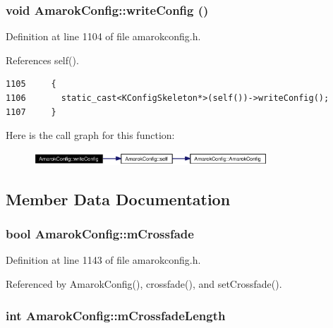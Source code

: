 \subsubsection{\setlength{\rightskip}{0pt plus 5cm}void Amarok\-Config::write\-Config ()\hspace{0.3cm}{\tt  [inline, static]}}\label{classAmarokConfig_AmarokConfige115}




Definition at line 1104 of file amarokconfig.h.

References self().



\footnotesize\begin{verbatim}1105     {
1106       static_cast<KConfigSkeleton*>(self())->writeConfig();
1107     }
\end{verbatim}\normalsize 


Here is the call graph for this function:\begin{figure}[H]
\begin{center}
\leavevmode
\includegraphics[width=248pt]{classAmarokConfig_AmarokConfige115_cgraph}
\end{center}
\end{figure}


\subsection{Member Data Documentation}
\subsubsection{\setlength{\rightskip}{0pt plus 5cm}bool {\bf Amarok\-Config::m\-Crossfade}\hspace{0.3cm}{\tt  [protected]}}\label{classAmarokConfig_AmarokConfigp27}




Definition at line 1143 of file amarokconfig.h.

Referenced by Amarok\-Config(), crossfade(), and set\-Crossfade().
\subsubsection{\setlength{\rightskip}{0pt plus 5cm}int {\bf Amarok\-Config::m\-Crossfade\-Length}\hspace{0.3cm}{\tt  [protected]}}\label{classAmarokConfig_AmarokConfigp28}




